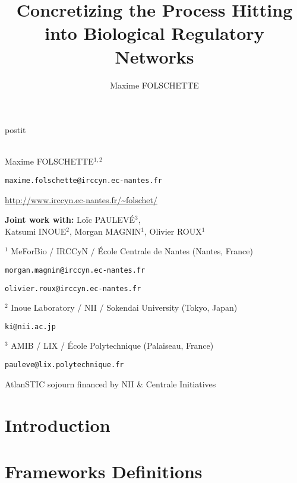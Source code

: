 \documentclass[fleqn,9pt,t]{beamer}
\date{\thedate}
\title[Concretizing the PH into BRNs]{Concretizing the Process Hitting\\into Biological Regulatory Networks}
\author{Maxime FOLSCHETTE}
\newcommand{\tval}[1]{\textbf{#1}}
\begin{document}
\begin{frame}[plain,label=title]

\begin{center}
\vspace{0.5cm}
\begin{beamercolorbox}[sep=0.5em]{postit}
\centering
\Large
\textbf{%
{\normalsize\theconference{}}\\~\\%
\inserttitle
}
\end{beamercolorbox}

\par
\medskip
\normalsize
Maxime FOLSCHETTE$^{1,2}$
\footnotesize

\texttt{maxime.folschette@irccyn.ec-nantes.fr}

\url{http://www.irccyn.ec-nantes.fr/~folschet/}

\normalsize
\bigskip
\tval{Joint work with:} Loïc PAULEVÉ$^3$, \\ Katsumi INOUE$^2$, Morgan MAGNIN$^1$, Olivier ROUX$^1$

\medskip
\footnotesize
$^1$ MeForBio / IRCCyN / École Centrale de Nantes (Nantes, France)

\texttt{morgan.magnin@irccyn.ec-nantes.fr}

\texttt{olivier.roux@irccyn.ec-nantes.fr}

\medskip
$^2$ Inoue Laboratory / NII / Sokendai University (Tokyo, Japan)

\texttt{ki@nii.ac.jp}

\medskip
$^3$ AMIB / LIX / École Polytechnique (Palaiseau, France)

\texttt{pauleve@lix.polytechnique.fr}

\bigskip
\normalsize
AtlanSTIC sojourn financed by NII \& Centrale Initiatives
\end{center}


\end{frame}




\section{Introduction}


\section{Frameworks Definitions}
\end{document}
